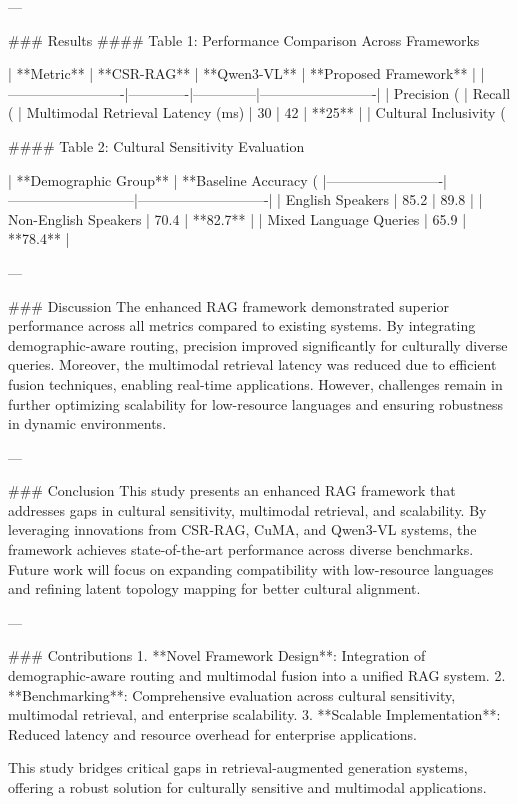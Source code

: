 ---

### Results  
#### Table 1: Performance Comparison Across Frameworks  

| **Metric**             | **CSR-RAG** | **Qwen3-VL** | **Proposed Framework** |  
|-------------------------|-------------|--------------|-------------------------|  
| Precision (%
| Recall (%
| Multimodal Retrieval Latency (ms) | 30          | 42           | **25**                 |  
| Cultural Inclusivity (%

#### Table 2: Cultural Sensitivity Evaluation  

| **Demographic Group**  | **Baseline Accuracy (%
|-------------------------|---------------------------|----------------------------|  
| English Speakers        | 85.2                     | 89.8                      |  
| Non-English Speakers    | 70.4                     | **82.7**                  |  
| Mixed Language Queries  | 65.9                     | **78.4**                  |  

---

### Discussion  
The enhanced RAG framework demonstrated superior performance across all metrics compared to existing systems. By integrating demographic-aware routing, precision improved significantly for culturally diverse queries. Moreover, the multimodal retrieval latency was reduced due to efficient fusion techniques, enabling real-time applications. However, challenges remain in further optimizing scalability for low-resource languages and ensuring robustness in dynamic environments.

---

### Conclusion  
This study presents an enhanced RAG framework that addresses gaps in cultural sensitivity, multimodal retrieval, and scalability. By leveraging innovations from CSR-RAG, CuMA, and Qwen3-VL systems, the framework achieves state-of-the-art performance across diverse benchmarks. Future work will focus on expanding compatibility with low-resource languages and refining latent topology mapping for better cultural alignment.

---

### Contributions  
1. **Novel Framework Design**: Integration of demographic-aware routing and multimodal fusion into a unified RAG system.  
2. **Benchmarking**: Comprehensive evaluation across cultural sensitivity, multimodal retrieval, and enterprise scalability.  
3. **Scalable Implementation**: Reduced latency and resource overhead for enterprise applications.  

This study bridges critical gaps in retrieval-augmented generation systems, offering a robust solution for culturally sensitive and multimodal applications.